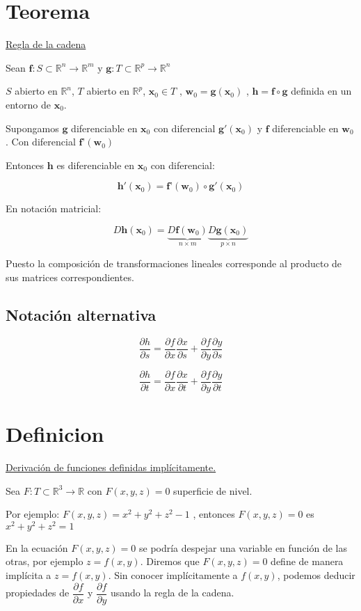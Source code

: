 \documentclass[12pt]{article}
\newcommand{\teorema}{\section{Teorema}}
\newcommand{\definicion}{\section{Definicion}}
\newcommand{\Rn}[1]{\mathbb{R}^{#1}}
\newcommand{\vecti}[2]{\textbf{#1}_{#2}}
\newcommand{\xo}{\vecti{x}{0}}
\newcommand{\f}{\textbf{f}}
\newcommand{\g}{\textbf{g}}
\newcommand{\h}{\textbf{h}}
\newcommand{\fd}{\textbf{f'}}
\newcommand{\R}{\mathbb{R}}
\newcommand{\tends}{\rightarrow}
\newcommand{\parcial}[2]{\dfrac{\partial #1}{\partial #2}}
\begin{document}
	\teorema 
	
	\underline{Regla de la cadena}
	
	\bigskip
	
	Sean $\f:S \subset \Rn{n} \tends \Rn{m}$ y $\g:T \subset \Rn{p} \tends \Rn{n}$
	
	$S$ abierto en $\Rn{n}$, $T$ abierto en $\Rn{p}$, $\xo \in T$ , $\vecti{w}{0} = \g (\xo)$ , $\h = \f \circ \g$ definida en un entorno de $\xo$.
	
	Supongamos $\g$ diferenciable en $\xo$ con diferencial $\g'(\xo)$ y $\f$ diferenciable en $\vecti{w}{0}$. Con diferencial $\fd (\vecti{w}{0})$
	
	Entonces $\h$ es diferenciable en $\xo$ con diferencial:
	
	$$ \h' (\xo) = \fd (\vecti{w}{0}) \circ \g' (\xo)$$
	
	En notación matricial:
	
	$$ D \h (\xo) = \underbrace{D \f (\vecti{w}{0})}_\text{$n \times m$} \underbrace{D \g (\xo)}_\text{$p \times n$} $$
	
	Puesto la composición de transformaciones lineales corresponde al producto de sus matrices correspondientes.
	
	\subsection*{Notación alternativa}
	
	$$ \parcial{h}{s} = \parcial{f}{x} \parcial{x}{s} + \parcial{f}{y} \parcial{y}{s}$$
	
	$$ \parcial{h}{t} = \parcial{f}{x}\parcial{x}{t} + \parcial{f}{y}\parcial{y}{t}$$
	
	\definicion
	
	\underline{Derivación de funciones definidas implícitamente.}
	
	\bigskip
	
	Sea $F:T \subset \Rn{3} \tends \R$ con $F(x,y,z) = 0$ superficie de nivel.
	
	\bigskip
	
	Por ejemplo: $F(x,y,z) = x^2 + y^2 + z^2 - 1$ , entonces $F(x,y,z) = 0$ es $x^2 + y^2 +z^2 = 1$
	
	\bigskip
	
	En la ecuación $F(x,y,z)=0$ se podría despejar una variable en función de las otras, por ejemplo $z=f(x,y)$. Diremos que $F(x,y,z) = 0$ define de manera implícita a $z=f(x,y)$. Sin conocer implícitamente a $f(x,y)$, podemos deducir propiedades de $\parcial{f}{x}$ y $\parcial{f}{y}$ usando la regla de la cadena.
	
\end{document}
